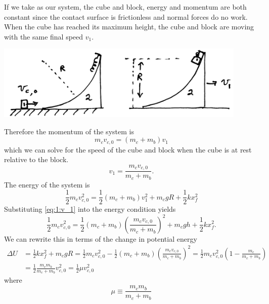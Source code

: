 \documentclass{esg8012exam}
\begin{document}
\begin{solution}
  If we take as our system, the cube and block, energy and momentum are both constant since the contact surface is frictionless and normal forces do no work. When the cube has reached its maximum height, the cube and block are moving with the same final speed $v_1$.
  \begin{center}\includegraphics[width=0.9\textwidth]{exam2_s1_1}\end{center}
  Therefore the momentum of the system is
  \begin{equation} m_c v_{c,0} = (m_c + m_b) v_1 \label{eq:1:system_momentum} \end{equation}
  which we can solve for the speed of the cube and block when the cube is at rest relative to the block.
  \begin{equation} v_1 =  \frac{m_c v_{c, 0}}{m_c + m_b}. \label{eq:1:v_1} \end{equation}
  The energy of the system is
  \begin{equation} \frac12 m_c v_{c,0}^2 = \frac12 (m_c + m_b)v_1^2 + m_c g R + \frac12 k x_f^2 \label{eq:1:system_energy} \end{equation}
  Substituting \autoref{eq:1:v_1} into the energy condition yields
  \begin{equation} \frac12 m_c v_{c,0}^2 = \frac12 (m_c + m_b)\left( \frac{m_c v_{c,0}}{m_c + m_b}\right)^2 + m_c g h + \frac12 k x_f^2. \label{eq:1:system_energy_2} \end{equation}
  We can rewrite this in terms of the change in potential energy
  \begin{align}
    \Delta U & = \frac12 k x_f^2 + m_c g R = \frac12 m_c v_{c,0}^2 - \frac12 (m_c + m_b) \left( \frac{m_c v_{c,0}}{m_c + m_b}\right)^2 = \frac12 m_c v_{c, 0}^2\left( 1 - \frac{m_c}{m_c + m_b}\right) \nonumber \\
    & = \frac12 \frac{m_c m_b}{m_c + m_b} v_{c,0}^2 = \frac12 \mu v_{c,0}^2 \label{eq:1:potential_energy}
  \end{align}
  where
  \begin{equation} \mu \equiv \frac{m_c m_b}{m_c + m_b} \label{eq:1:def_mu} \end{equation}

\end{solution}
\end{document}
